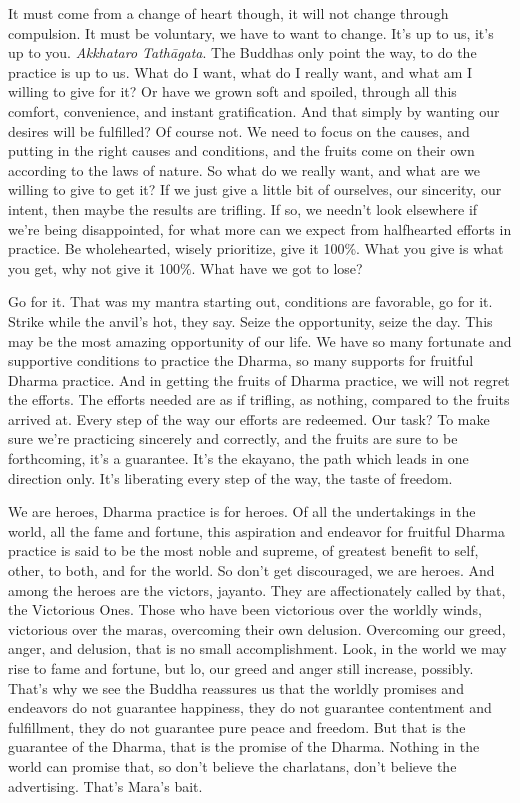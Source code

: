 \documentclass[12pt,openany]{book}
\begin{document}
It must come from a change of heart though, it will not change through compulsion. It must be voluntary, we have to want to change. It’s up to us, it's up to you. \textit{Akkhataro Tathāgata}. The Buddhas only point the way, to do the practice is up to us. What do I want, what do I really want, and what am I willing to give for it? Or have we grown soft and spoiled, through all this comfort, convenience, and instant gratification. And that simply by wanting our desires will be fulfilled? Of course not. We need to focus on the causes, and putting in the right causes and conditions, and the fruits come on their own according to the laws of nature. So what do we really want, and what are we willing to give to get it? If we just give a little bit of ourselves, our sincerity, our intent, then maybe the results are trifling. If so, we needn't look elsewhere if we're being disappointed, for what more can we expect from halfhearted efforts in practice. Be wholehearted, wisely prioritize, give it 100\%. What you give is what you get, why not give it 100\%. What have we got to lose?

Go for it. That was my mantra starting out, conditions are favorable, go for it. Strike while the anvil’s hot, they say. Seize the opportunity, seize the day. This may be the most amazing opportunity of our life. We have so many fortunate and supportive conditions to practice the Dhar\-ma, so many supports for fruitful Dhar\-ma practice. And in getting the fruits of Dhar\-ma practice, we will not regret the efforts. The efforts needed are as if trifling, as nothing, compared to the fruits arrived at. Every step of the way our efforts are redeemed. Our task? To make sure we're practicing sincerely and correctly, and the fruits are sure to be forthcoming, it's a guarantee. It’s the ekayano, the path which leads in one direction only. It’s liberating every step of the way, the taste of freedom.

We are heroes, Dhar\-ma practice is for heroes. Of all the undertakings in the world, all the fame and fortune, this aspiration and endeavor for fruitful Dhar\-ma practice is said to be the most noble and supreme, of greatest benefit to self, other, to both, and for the world. So don't get discouraged, we are heroes. And among the heroes are the victors, jayanto. They are affectionately called by that, the Victorious Ones. Those who have been victorious over the worldly winds, victorious over the maras, overcoming their own delusion. Overcoming our greed, anger, and delusion, that is no small accomplishment. Look, in the world we may rise to fame and fortune, but lo, our greed and anger still increase, possibly. That's why we see the Buddha reassures us that the worldly promises and endeavors do not guarantee happiness, they do not guarantee contentment and fulfillment, they do not guarantee pure peace and freedom. But that is the guarantee of the Dhar\-ma, that is the promise of the Dhar\-ma. Nothing in the world can promise that, so don't believe the charlatans, don’t believe the advertising. That’s Mara's bait.
\end{document}
